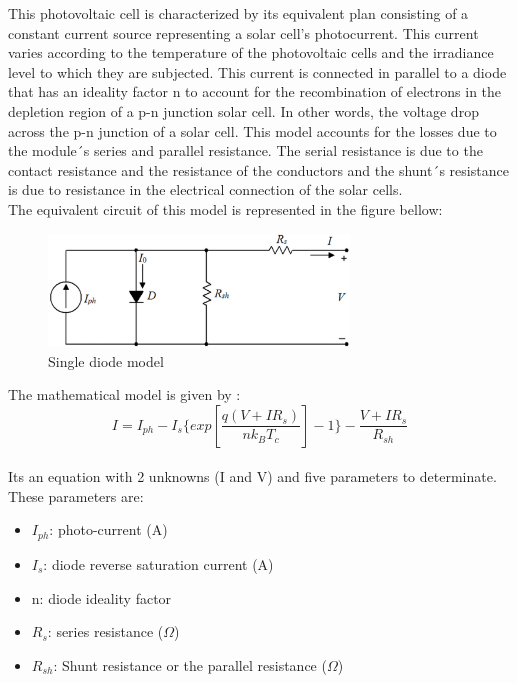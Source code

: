 \documentclass{report}
\begin{document}
This photovoltaic cell is characterized by its equivalent plan consisting of a constant current source representing a solar cell's photocurrent. This current varies according to the temperature of the photovoltaic cells and the irradiance level to which they are subjected. This current is connected in parallel to a diode that has an ideality factor n to account for the recombination of electrons in the depletion region of a p-n junction solar cell.  In other words, the voltage drop across the p-n junction of a solar cell. This model accounts for the losses due to the module´s series and parallel resistance. The serial resistance is due to the contact resistance and the resistance of the conductors and the shunt´s resistance is due to resistance in the electrical connection of the solar cells. \\
\newpage
The equivalent circuit of this model is represented in the figure bellow:\\


\begin{figure}[h!]
  \centering
    \includegraphics[width=8cm, height=3cm] {fivep.png}
    \caption{Single diode model \cite{kalogiroubook}}
    \label{fig:my_label}
\end{figure}
\hfill \break
The mathematical model is given by :
\begin{equation}
I = I_{ph} - I_{s} \{ exp
 \left[  \frac{q(V+IR_{s})}{nk_{B}T_{c}} \right] - 1 \} - \frac{V+IR_{s}}{R_{sh}}
\end{equation}
\\
Its an equation with 2 unknowns (I and V) and five parameters to determinate. These parameters are:

\begin{itemize}
    \item $I_{ph}$: photo-current (A)
    \item $I_{s}$: diode reverse saturation current (A)
    \item n: diode ideality factor
    \item $R_{s}$: series resistance ($\Omega$)
    \item $R_{sh}$: Shunt resistance or the parallel resistance ($\Omega$)
\end{itemize}
\end{document}
